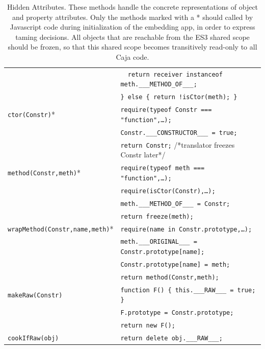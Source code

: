 \documentclass[letterpaper,twocolumn,10pt]{article}
\newcommand{\code}[1]{{\tt {#1}}}              %
\begin{document}
\begin{table}
\begin{tabular}{ll}
       & \code{\ \ return receiver instanceof meth.\_\_\_METHOD\_OF\_\_\_;} \\
       & \code{\} else\ \{ return !isCtor(meth); \}} \\
  \hline
  \code{ctor(Constr)}*
       & \code{require(typeof Constr === "function",\ldots);} \\
       & \code{Constr.\_\_\_CONSTRUCTOR\_\_\_ = true;} \\
       & \code{return Constr;} /*translator freezes Constr later*/ \\
  \code{method(Constr,meth)}*
       & \code{require(typeof meth === "function",\ldots);} \\
       & \code{require(isCtor(Constr),\ldots);} \\
       & \code{meth.\_\_\_METHOD\_OF\_\_\_ = Constr;} \\
       & \code{return freeze(meth);} \\
  \code{wrapMethod(Constr,name,meth)}*
       & \code{require(name in Constr.prototype,\ldots);}\\
       & \code{meth.\_\_\_ORIGINAL\_\_\_ = Constr.prototype[name];}\\
       & \code{Constr.prototype[name] = meth;}\\
       & \code{return method(Constr,meth);}\\
  \hline
  \code{makeRaw(Constr)}
       & \code{function F()\ \{ this.\_\_\_RAW\_\_\_ = true; \}} \\
       & \code{F.prototype = Constr.prototype;} \\
       & \code{return new F();} \\
  \code{cookIfRaw(obj)}
       & \code{return delete obj.\_\_\_RAW\_\_\_;} \\
\end{tabular}

\caption[Hidden Attributes.]{Hidden Attributes. These methods handle the 
concrete representations of object and property attributes. Only the methods 
marked with a * should called by Javascript code during initialization of the 
embedding app, in order to express taming decisions. All objects that are 
reachable from the ES3 shared scope should be frozen, so that this shared 
scope becomes transitively read-only to all Caja code.}
\label{tab:hide-attr}
\end{table}
\end{document}
